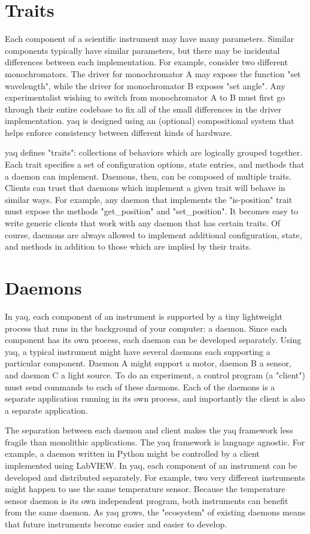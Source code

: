 \documentclass{article}
\begin{document}
\section{Traits}

Each component of a scientific instrument may have many parameters.
Similar components typically have similar parameters, but there may be incidental differences between each implementation.
For example, consider two different monochromators.
The driver for monochromator A may expose the function "set wavelength", while the driver for monochromator B exposes "set angle".
Any experimentalist wishing to switch from monochromator A to B must first go through their entire codebase to fix all of the small differences in the driver implementation.
yaq is designed using an (optional) compositional system that helps enforce consistency between different kinds of hardware.

yaq defines "traits": collections of behaviors which are logically grouped together.
Each trait specifies a set of configuration options, state entries, and methods that a daemon can implement.
Daemons, then, can be composed of multiple traits.
Clients can trust that daemons which implement a given trait will behave in similar ways.
For example, any daemon that implements the "is-position" trait must expose the methods "get\_position" and "set\_position".
It becomes easy to write generic clients that work with any daemon that has certain traits.
Of course, daemons are always allowed to implement additional configuration, state, and methods in addition to those which are implied by their traits.

\section{Daemons}

In yaq, each component of an instrument is supported by a tiny lightweight process that runs in the background of your computer: a daemon.
Since each component has its own process, each daemon can be developed separately.
Using yaq, a typical instrument might have several daemons each supporting a particular component.
Daemon A might support a motor, daemon B a sensor, and daemon C a light source.
To do an experiment, a control program (a "client") must send commands to each of these daemons.
Each of the daemons is a separate application running in its own process, and importantly the client is also a separate application.

The separation between each daemon and client makes the yaq framework less fragile than monolithic applications.
The yaq framework is language agnostic.
For example, a daemon written in Python might be controlled by a client implemented using LabVIEW.
In yaq, each component of an instrument can be developed and distributed separately.
For example, two very different instruments might happen to use the same temperature sensor.
Because the temperature sensor daemon is its own independent program, both instruments can benefit from the same daemon.
As yaq grows, the "ecosystem" of existing daemons means that future instruments become easier and easier to develop.
\end{document}
